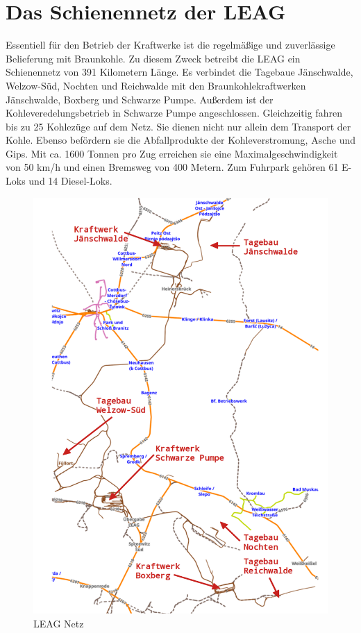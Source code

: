 \section{Das Schienennetz der LEAG}
Essentiell für den Betrieb der Kraftwerke ist die regelmäßige und zuverlässige Belieferung mit Braunkohle. Zu diesem Zweck betreibt die LEAG  ein Schienennetz von 391 Kilometern Länge. Es verbindet die Tagebaue Jänschwalde, Welzow-Süd, Nochten und Reichwalde mit den Braunkohlekraftwerken Jänschwalde, Boxberg und Schwarze Pumpe. Außerdem ist der Kohleveredelungsbetrieb in Schwarze Pumpe angeschlossen. Gleichzeitig fahren bis zu 25 Kohlezüge auf dem Netz. Sie dienen nicht nur allein dem Transport der Kohle. Ebenso befördern sie die Abfallprodukte der Kohleverstromung, Asche und Gips. Mit ca. 1600 Tonnen pro Zug erreichen sie eine Maximalgeschwindigkeit von 50 km/h und einen Bremsweg von 400 Metern. Zum Fuhrpark gehören 61 E-Loks und 14 Diesel-Loks.

\begin{figure}[!hb]
	\centering
	\includegraphics[width=0.75\linewidth]{images/LEAG-Netz-annotated.png}
	\caption{LEAG Netz}
	\label{fig:leag-netz}
\end{figure}